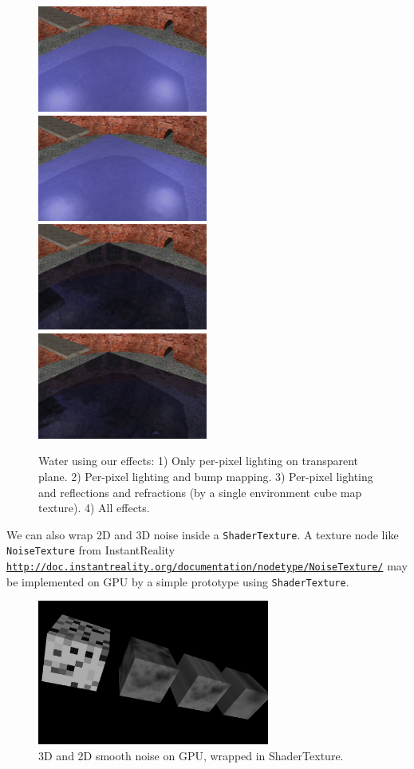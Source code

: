 \documentclass{acmsiggraph}                     %
\newcommand*{\myhref}[2]{\texttt{\href{#1}{\nolinkurl{#2}}}}
\begin{document}
\begin{figure}[t]
  \centering
  \includegraphics[width=2.2in]{water_shaders_0}
  \includegraphics[width=2.2in]{water_shaders_1}
  \includegraphics[width=2.2in]{water_shaders_2}
  \includegraphics[width=2.2in]{water_shaders_3}
  \caption{Water using our effects: 1) Only per-pixel lighting on transparent
plane. 2) Per-pixel lighting and bump mapping. 3) Per-pixel lighting and
reflections and refractions (by a single environment cube map texture).
4) All effects.}
\end{figure}

We can also wrap 2D and 3D noise inside a \texttt{ShaderTexture}.
A texture node like \texttt{NoiseTexture} from InstantReality
\myhref{http://doc.instantreality.org/documentation/nodetype/NoiseTexture/}{http://doc.instantreality.org/documentation/nodetype/NoiseTexture/}
may be implemented on GPU by a simple prototype using \texttt{ShaderTexture}.

\begin{figure}[H]
  \centering
  \includegraphics[width=3in]{noise}
  \caption{3D and 2D smooth noise on GPU, wrapped in ShaderTexture.}
\end{figure}
\end{document}
